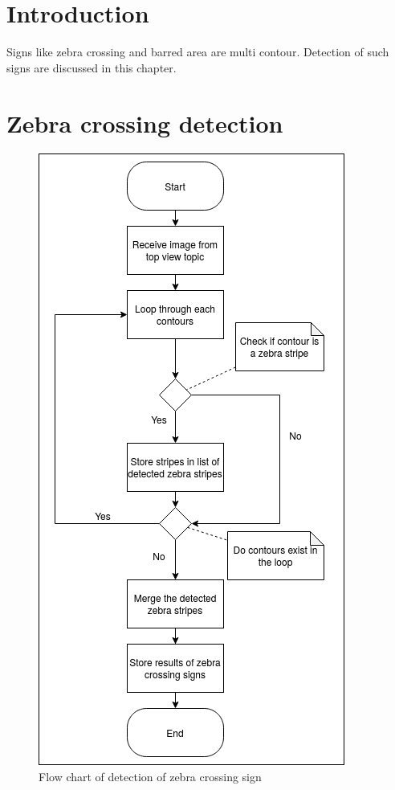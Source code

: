 \section{Introduction}
Signs like zebra crossing and barred area are multi contour. Detection of such signs are discussed in this chapter.

\section{Zebra crossing detection}
\begin{figure}[h!]
    \centering
    \includegraphics[scale=0.45]{images/ZebraCrossingFlowChart.png}
    \caption{Flow chart of detection of zebra crossing sign}
\end{figure}


